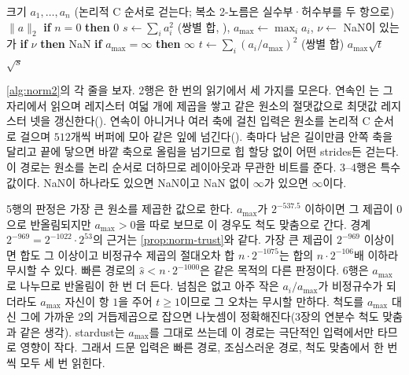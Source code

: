 \begin{algorithm}[htbp]
\begin{algorithmic}[1]
\Require 크기 $a_1,\dots,a_n$ (논리적 C 순서로 걷는다; 복소 2-노름은 실수부·허수부를 두 항으로)
\Ensure $\|a\|_2$
\State \textbf{if} $n=0$ \textbf{then} \Return $0$
\State $s\gets\sum_ia_i^2$ (쌍별 합, ), $a_{\max}\gets\max_ia_i$, $\nu\gets$ NaN이 있는가 
\State \textbf{if} $\nu$ \textbf{then} \Return NaN
\State \textbf{if} $a_{\max}=\infty$ \textbf{then} \Return $\infty$
 
  \State $t\gets\sum_i(a_i/a_{\max})^2$ (쌍별 합) 
  \State \Return $a_{\max}\sqrt t$
\EndIf
\State \Return $\sqrt s$
\end{algorithmic}
\caption{넘치지 않는 2-노름의 조심스러운 경로 (stardust 의 )}
\label{alg:norm2}
\end{algorithm}

\cref{alg:norm2}의 각 줄을 보자. 2행은 한 번의 읽기에서 세 가지를 모은다. 연속인 는 그 자리에서 읽으며 레지스터 여덟 개에 제곱을 쌓고 같은 원소의 절댓값으로 최댓값 레지스터 넷을 갱신한다(). 연속이 아니거나 여러 축에 걸친 입력은 원소를 논리적 C 순서로 걸으며 $512$개씩 버퍼에 모아 같은 잎에 넘긴다(). 축마다 남은 길이만큼 안쪽 축을 달리고 끝에 닿으면 바깥 축으로 올림을 넘기므로 힙 할당 없이 어떤 strides든 걷는다. 이 경로는 원소를 논리 순서로 더하므로 레이아웃과 무관한 비트를 준다. 3--4행은 특수값이다. NaN이 하나라도 있으면 NaN이고 NaN 없이 $\infty$가 있으면 $\infty$이다.

5행의 판정은 가장 큰 원소를 제곱한 값으로 한다. $a_{\max}$가 $2^{-537.5}$ 이하이면 그 제곱이 $0$으로 반올림되지만 $a_{\max}>0$을 따로 보므로 이 경우도 척도 맞춤으로 간다. 경계 $2^{-969}=2^{-1022}\cdot2^{53}$의 근거는 \cref{prop:norm-trust}와 같다. 가장 큰 제곱이 $2^{-969}$ 이상이면 합도 그 이상이고 비정규수 제곱의 절대오차 합 $n\cdot2^{-1075}$는 합의 $n\cdot2^{-106}$배 이하라 무시할 수 있다. 빠른 경로의 $\hat s<n\cdot2^{-1000}$은 같은 목적의 다른 판정이다. 6행은 $a_{\max}$로 나누므로 반올림이 한 번 더 든다. 넘침은 없고 아주 작은 $a_i/a_{\max}$가 비정규수가 되더라도 $a_{\max}$ 자신이 항 $1$을 주어 $t\ge1$이므로 그 오차는 무시할 만하다. 척도를 $a_{\max}$ 대신 그에 가까운 $2$의 거듭제곱으로 잡으면 나눗셈이 정확해진다(3장의 연분수 척도 맞춤과 같은 생각). stardust는 $a_{\max}$를 그대로 쓰는데 이 경로는 극단적인 입력에서만 타므로 영향이 작다. 그래서 드문 입력은 빠른 경로, 조심스러운 경로, 척도 맞춤에서 한 번씩 모두 세 번 읽힌다.


